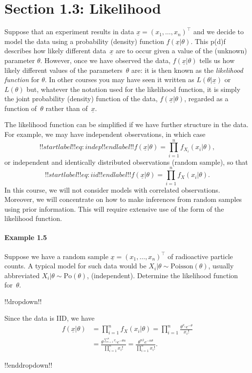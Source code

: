 \clearpage

\section{Section 1.3: Likelihood}
Suppose that an experiment results in data $\underline{x} = (x_1, \ldots, x_n)^\top$ and we decide to model the data using a probability (density) function $f(\underline{x}|\theta)$. This p(d)f describes how likely different data~$\underline{x}$ are to occur given a value of the (unknown) parameter $\theta$. However, once we have observed the data, $f(\underline{x}|\theta)$ tells us how likely different values of the parameters~$\theta$ are: it is then known as the \emph{likelihood function} for $\theta$. In other courses you may have seen it written as $L(\theta|\underline{x})$ or $L(\theta)$ but, whatever the notation used for the likelihood function, it is simply the joint probability (density) function of the data, $f(\underline{x}|\theta)$, regarded as a function of~$\theta$ rather than of~$\underline{x}$.

The likelihood function can be simplified if we have further structure in the data. For example, we may have independent observations, in which case
\begin{equation}
!!startlabel!! eq:indep !!endlabel!!
f(\underline{x}|\theta)=\prod_{i=1}^n f_{X_i}(x_i|\theta),
\end{equation}
or independent and identically distributed observations (random sample), so that
\begin{equation}
!!startlabel!! eq:iid !!endlabel!!
f(\underline{x}|\theta)=\prod_{i=1}^n f_{X}(x_i|\theta).
\end{equation}
In this course, we will not consider models with correlated observations. Moreover, we will concentrate on how to make inferences from random samples using prior information. This will require extensive use of the  form of the likelihood function.

\clearpage

\paragraph{Example 1.5}{Suppose we have a random sample $\underline{x} = (x_1, \ldots, x_n)^\top$ of radioactive particle counts. A typical model for such data would be $X_i|\theta\sim \mathrm{Poisson}(\theta)$, usually abbreviated $X_{i}|\theta\sim\mathrm{Po}(\theta)$, (independent). Determine the likelihood function for~$\theta$.

!!dropdown!!

Since the data is IID, we have
        \begin{align*}
            f(\underline{x}|\theta) &= \prod_{i=1}^n f_{X}(x_i|\theta) = \prod_{i=1}^n \frac{\theta^{x_i} e^{-\theta}}{x_i!} \\
            &= \frac{\theta^{\sum_{i=1}^n x_i} e^{-\theta n}}{\prod_{i=1}^n x_i!} = \frac{\theta^{n\bar{x}} e^{-n\theta}}{\prod_{i=1}^n x_i!}.
        \end{align*}

!!enddropdown!!}

